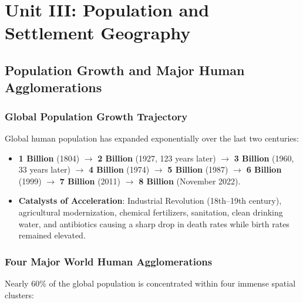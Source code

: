 \documentclass[11pt,a4paper]{article}
\begin{document}
\newpage
\section{Unit III: Population and Settlement Geography}

\subsection{Population Growth and Major Human Agglomerations}

\subsubsection{Global Population Growth Trajectory}
Global human population has expanded exponentially over the last two centuries:
\begin{itemize}[leftmargin=*]
  \item \textbf{1 Billion} (1804) $\rightarrow$ \textbf{2 Billion} (1927, 123 years later) $\rightarrow$ \textbf{3 Billion} (1960, 33 years later) $\rightarrow$ \textbf{4 Billion} (1974) $\rightarrow$ \textbf{5 Billion} (1987) $\rightarrow$ \textbf{6 Billion} (1999) $\rightarrow$ \textbf{7 Billion} (2011) $\rightarrow$ \textbf{8 Billion} (November 2022).
  \item \textbf{Catalysts of Acceleration}: Industrial Revolution (18th--19th century), agricultural modernization, chemical fertilizers, sanitation, clean drinking water, and antibiotics causing a sharp drop in death rates while birth rates remained elevated.
\end{itemize}

\subsubsection{Four Major World Human Agglomerations}
Nearly 60\% of the global population is concentrated within four immense spatial clusters:
\end{document}
